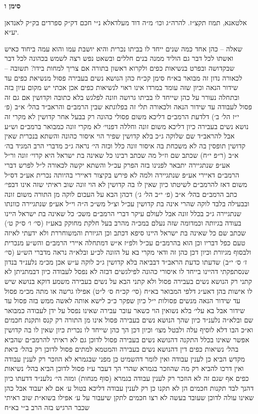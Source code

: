 \documentclass[12pt, openany]{book}
\newcommand{\chapname}{}
\newcommand{\newchap}[1]{
	\addcontentsline{toc}{chapter}{#1}
	\renewcommand{\chapname}{#1}
		\begin{center}
			\textbf{%
\fontsize{16pt}{16pt}\selectfont
				#1}
		\end{center}
}
\begin{document}
\newchap{סימן ו}
\begin{multicols}{2}
אלטאנא, תמוז תקצ״ז. להרה״ג וכו׳ מ״ה דוד מעלדאלא נ״י חכם דק״ק ספרדים בק״ק לאנדאן יע״א.\\\vspace{0pt}

שאלה – כהן אחד כמה שנים ייחד לו בביתו נכרית והיא יושבת עמו והוא עמה ביחוד כאיש ואשתו לכל דבר גם הוליד ממנה בנים חללים ובשאט נפש רצה לשמש בכהונה לכל דבר שבקדושה ובפרט בנשיאות כפים ולקרוא ראשון בתורה אם צריך למחות בידו? תשובה – לכאורה נדון זה מבואר בא״ח סימן קכ״ח כהן הנושא נשים בעבירה פסול מנשיאת כפים עד שידור הנאה וכיון שזה עומד במרדו אינו ראוי לנשיאות כפים אכן אכתי יש מקום עיון בזה ובתחלה נעורר על כהן שייחד לו בביתו גרושה וזונה לפלגש בלא כתובה וקדושין אם גם זה פסול לעבודה עד שידור הנאה ולכאורה תלי זה בפלוגתא שבין הרמב״ם והראב״ד בהל׳ א״ב (פ׳ י״ז הל׳ ב׳) דלדעת הרמב״ם דליכא משום פסולי כהונה רק בבעל אחר קדושין לא מקרי זה נושא נשים בעבירה כיון דליכא משום זונה וחללה דפנוי׳ לא מקרי זונה כמבואר ברמב״ם וש״ע אבל להראב״ד שם שלוקה ג״כ בלא קדושין שפיר הוי איסור כהונה והשתא בנכרית שאין קדושין תופסין בה לא משכחת בה איסור זונה כלל וכזה הי׳ נראה ג״כ מדברי הרב המגיד בה׳ א״ב (ר״פ י״ח) שכתב שם וז״ל מה שכתב רבינו כל שאינה בת ישראל היא קרוי׳ זונה ור״ל אע״פ שנתגיירה יתבאר לפנינו בזה הפרק עכ״ל והשתא יקשה לכאורה ל״ל לפרש דברי הרמב״ם דאיירי אע״פ שנתגיירה ולמה לא פירש בקיצור דאיירי בהיותה נכרית אע״כ דס״ל משום דאז להרמב״ם לשיטתו כיון שאין לו בה קדושין לא הוי זונה שוב ראיתי שזה אינו דבפי׳ כתב הרמב״ם בהל׳ א״ב (פ׳ י״ב הל׳ ג׳) דכהן הבא על העכום לוקה מן התורה משום זונה ובבעילה בלבד לוקה שהרי אינה בת קדושין עכ״ל וצ״ל מש״כ ה״ה וי״ל אע״פ שנתגיירה כוונתו שנתגיירה ג״כ בכלל זונה אבל לעולם עיקר דברי הרמב״ם משכ׳ כל שאינה בת ישראל היינו בעודה בגיותה וכמדומה שזה נעלם במכ״ה מהרב בעל חלקת מחוקק באע״ז (סי׳ ו׳ ס״ק ט׳) שכתב שם כל שאינה בת ישראל היינו סיפא דכתב וכן הגיורת והמשוחררת ולא ידעתי לאיזה טעם כפל דבריו וכן הוא בהרמב״ם עכ״ל ולפ״ז א״ש דמתחלה איירי הרמב״ם והש״ע מנכרית ולבסוף מגיורת וכיון דכן כהן זה ודאי מקרי בא על הזונה לכ״ע ובלא״ה נראה מדברי הש״ע (סי׳ ז׳ ס׳ י״ב) שדעתו כדעת הראב״ד דבביאה בלא קדושין ג״כ לוקה ע״ש אכן מכ״מ נלענ״ד בנדון שנסתפקתי דהיינו בייחד לו איסורי כהונה לפילגשים דבזה לא נפסל לעבודה כיון דבמתניתן לא קתני רק הנושא נשים בעבירה פסול ולא קתני הבא על נשים בעבירה משמע דוקא בנושא שיש לו אישות בהן דאע״ג דלפי המבואר בא״ח (סי׳ קכ״ח ס׳ ל״ט) אפילו גרשה או מתה מכ״מ פסול עד שידור הנאה מנשים פסולות י״ל כיון שפקר כ״כ לישא אותה לאשה ממש בזה פסול עד שידור אבל בא עלי׳ בלא נשואין הוי כשאר עובר עבירה שאינו נפסל על ידן לעבודה כמבואר שם ובלא״ה נלענ״ד כיון שהך הנושא נשים בעבירה פסול אינו מן התורה רק קנס ותקנת חכמים וא״כ הבו דלא לוסיף עלה ולבטל מצו׳ וכיון דכן הך כהן שייחד לו נכרית כיון שאין לו בה קדושין אפשר שאינו בכלל התקנה דהנושא נשים בעבירה פסול לדוכן גם לא ראיתי להרמב״ם שהביא בהל׳ נשיאות כפים דין דהנושא נשים בעבירה והמטמא למתים פסול לדוכן רק בהל׳ ביאת מקדש הביא כן לענין עבודה ואין לומר דהשמיט כן מפני שבגמרא לא הוזכר רק לענין עבודה ואין דרכו להביא רק מה שהוזכר בגמרא שהרי הך דעבר ע״ז פסול לדוכן הביא בהל׳ נשיאות כפים אף שגם זה לא הוזכר רק לענין עבודה בגמרא (סוף מנחות) ומזה הי׳ נלענ״ד דדעתו כיון דהנך לבד תקנות חכמים הן לא תקנו כן רק לענין עבודה דליכא בטול ע׳ אם לא יעבוד אבל כהן שאינו עולה לדוכן שעובד בעשה לא רצו חכמים לתקן שיעבור על ע׳ אפילו בשוא״ת שוב ראיתי שכבר הרגיש בזה הרב ב״י בא״ח 
\end{multicols}
\end{document}
